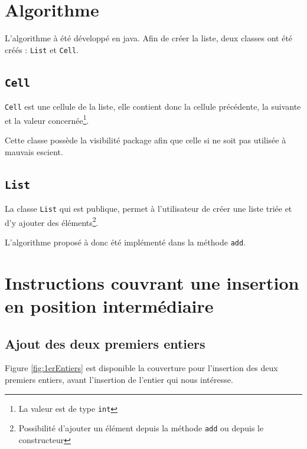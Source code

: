 \documentclass[a4paper, 11pt]{article}
\begin{document}
	\maketitle

	\section{Algorithme}
	L'algorithme à été développé en java. Afin de créer la liste, deux classes ont été créés : \texttt{List} et \texttt{Cell}. 

	\subsection{\texttt{Cell}}
	\texttt{Cell} est une cellule de la liste, elle contient donc la cellule précédente, la suivante et la valeur concernée\footnote{La valeur est de
	type \texttt{int}}. 

	Cette classe possède la visibilité package afin que celle si ne soit pas utilisée à mauvais escient.

	

	\subsection{\texttt{List}}
	La classe \texttt{List} qui est publique, permet à l'utilisateur de créer une liste triée et d'y ajouter des éléments\footnote{Possibilité d'ajouter
	un élément depuis la méthode \texttt{add} ou depuis le constructeur}.

	L'algorithme proposé à donc été implémenté dans la méthode \texttt{add}.
	

	\section{Instructions couvrant une insertion en position intermédiaire}
	\subsection{Ajout des deux premiers entiers}
	Figure \ref{fig:1erEntiers} est disponible la couverture pour l'insertion des deux premiers entiers, avant l'insertion de l'entier qui nous
	intéresse.
\end{document}
